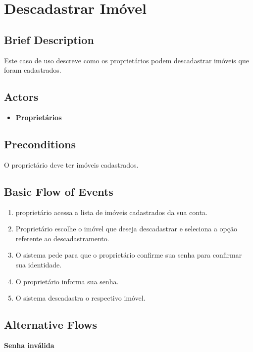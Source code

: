\section{Descadastrar Imóvel}

\subsection*{Brief Description}
Este caso de uso descreve como os proprietários podem descadastrar imóveis que foram cadastrados.

\subsection*{Actors}

\begin{itemize}
    \item \textbf{Proprietários} 
\end{itemize}

\subsection*{Preconditions}
O proprietário deve ter imóveis cadastrados.

\subsection*{Basic Flow of Events}

\begin{enumerate}
    \item proprietário acessa a lista de imóveis cadastrados da sua conta.
    \item Proprietário escolhe o imóvel que deseja descadastrar e seleciona a opção referente ao descadastramento.
    \item O sistema pede para que o proprietário confirme sua senha para confirmar sua identidade. 
    \item O proprietário informa sua senha.
    \item O sistema descadastra o respectivo imóvel.
\end{enumerate}

\subsection*{Alternative Flows}

\textbf{Senha inválida}

